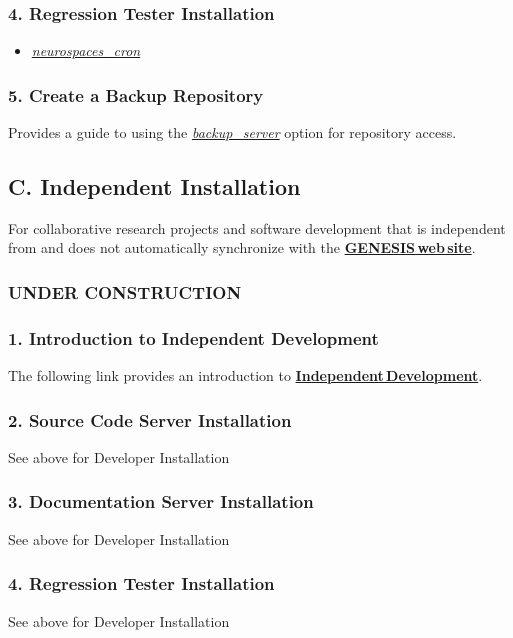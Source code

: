 \documentclass[12pt]{article}
\begin{document}
\subsubsection*{4. Regression Tester Installation}

\begin{itemize}
   \item[]\href{../neurospaces-cron/neurospaces-cron.tex}{\it neurospaces\_cron}
\end{itemize}

\subsubsection*{5. Create a Backup Repository}

Provides a guide to using the \href{../backup-repository/backup-repository.tex}{\it backup\_server} option for repository access.

\subsection*{C. Independent Installation}

For collaborative research projects and software development that is independent from and does not automatically synchronize with the \href{http://www.genesis-sim.org/}{\bf GENESIS\,web\,site}.

\subsubsection*{UNDER CONSTRUCTION}

\subsubsection*{1. Introduction to Independent Development}

The following link provides an introduction to \href{../developer-intro/developer-intro.tex}{\bf Independent\,Development}.

\subsubsection*{2. Source Code Server Installation}

See above for Developer Installation

\subsubsection*{3. Documentation Server Installation}

See above for Developer Installation

\subsubsection*{4. Regression Tester Installation}

See above for Developer Installation
\end{document}
